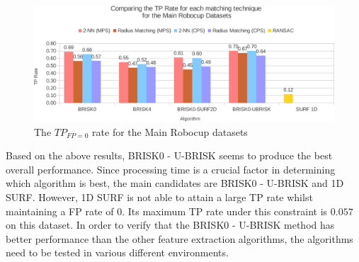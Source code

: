 \documentclass{report}
\begin{document}
%

\begin{figure}
  \centering
    \includegraphics[width=1.0\textwidth]{../Drawings/Graphs/tp_rate_mrb.pdf}
    \caption{The $TP_{FP=0}$ rate for the Main Robocup datasets} 
    \label{fig:tp_rate_mrd}
\end{figure}



Based on the above results, BRISK0 - U-BRISK seems to produce the best overall performance. Since processing time is a crucial factor in determining which algorithm is best, the main candidates are BRISK0 - U-BRISK and 1D SURF. However, 1D SURF is not able to attain a large TP rate whilst maintaining a FP rate of 0. Its maximum TP rate under this constraint is $0.057$ on this dataset. In order to verify that the BRISK0 - U-BRISK method has better performance than the other feature extraction algorithms, the algorithms need to be tested in various different environments.\\ 
\end{document}
